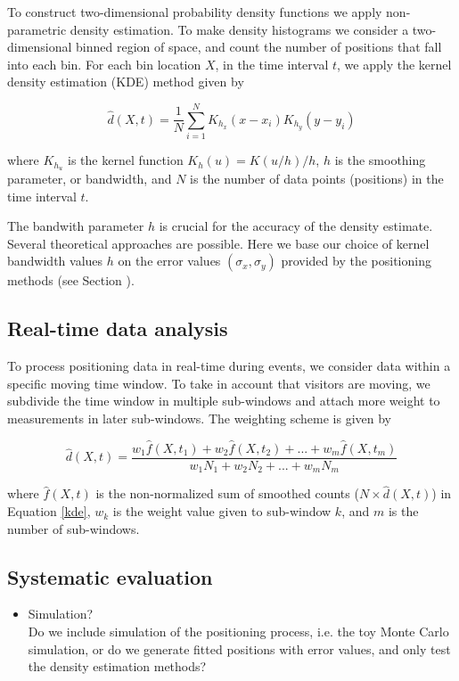 \documentclass[10pt,a4paper]{article}
\begin{document}
To construct two-dimensional probability density functions we apply non-parametric density estimation.
To make density histograms we consider a two-dimensional binned region of space, and count the number of positions that fall into each bin. For each bin location $X$, in the time interval $t$, we apply the kernel density estimation (KDE) method \cite{scott}\cite{silverman} given by

\begin{equation}
\hat{d}(X,t)=\frac{1}{N }\sum_{i=1}^{N} K_{h_{x}} (x-x_{i}) K_{h_{y}} (y-y_{i})
\label{kde}
\end{equation}

where $K_{h_{u}}$ is the kernel function $K_{h}(u)=K(u/h)/h$, $h$ is the smoothing parameter, or bandwidth, and $N$ is the number of data points (positions) in the time interval $t$.

The bandwith parameter $h$ is crucial for the accuracy of the density estimate. 
Several theoretical approaches are possible.
Here we base our choice of kernel bandwidth values $h$ on the error values $(\sigma_{x},\sigma_{y})$ provided by the positioning methods (see Section ).

\subsection{Real-time data analysis}

To process positioning data in real-time during events, we consider data within a specific moving time window.
To take in account that visitors are moving, we subdivide the time window in multiple sub-windows and attach more weight to measurements in later sub-windows. The weighting scheme is given by

\begin{equation}
\hat{d}(X,t)=\frac{w_{1}\hat{f}(X,t_{1})+w_{2}\hat{f}(X,t_{2})+...+w_{m}\hat{f}(X,t_{m})}{w_{1}N_{1}+w_{2}N_{2}+...+w_{m}N_{m}}
\end{equation}

\noindent where $\hat{f}(X,t)$ is the non-normalized sum of smoothed counts ($N\times\hat{d}(X,t)$) in Equation \ref{kde}, $w_{k}$ is the weight value given to sub-window $k$, and $m$ is the number of sub-windows.

\subsection{Systematic evaluation}

\begin{itemize}
\item Simulation?\\
Do we include simulation of the positioning process, i.e. the toy Monte Carlo simulation, or do we generate fitted positions with error values, and only test the density estimation methods?
\end{itemize}
\end{document}
